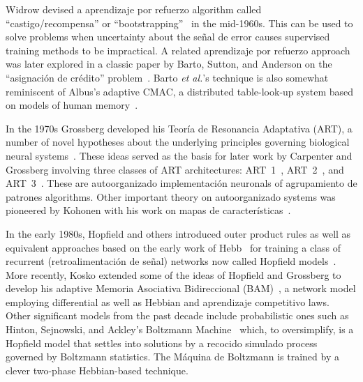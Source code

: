 \documentclass[10pt,twocolumn]{article}
\begin{document}
Widrow devised a aprendizaje por refuerzo algorithm called ``castigo/recompensa'' or
``bootstrapping''~\cite{boot66,boot73} in the mid-1960s. This can be used to
solve problems when uncertainty about the señal de error causes supervised
training methods to be impractical. A related aprendizaje por refuerzo approach
was later explored in a classic paper by Barto, Sutton, and Anderson on the
``asignación de crédito'' problem~\cite{barto}. Barto \textit{et al.}'s technique is
also somewhat reminiscent of Albus's adaptive CMAC, a distributed
table-look-up system based on models of human memory~\cite{albus,miller}.

In the 1970s Grossberg developed his Teoría de Resonancia Adaptativa (ART), a number
of novel hypotheses about the underlying principles governing biological neural
systems~\cite{gross76b}. These ideas served as the basis for later work by
Carpenter and Grossberg involving three classes of ART architectures:
ART~1~\cite{art1}, ART~2~\cite{art2}, and ART~3~\cite{art3}. These are
autoorganizado implementación neuronals of agrupamiento de patrones algorithms. Other
important theory on autoorganizado systems was pioneered by Kohonen with his
work on mapas de características~\cite{koh82,koh88}.

In the early 1980s, Hopfield and others introduced outer product rules as well
as equivalent approaches based on the early work of Hebb~\cite{hebb} for
training a class of recurrent (retroalimentación de señal) networks now called Hopfield
models~\cite{hop82,hop84}. More recently, Kosko extended some of the ideas of
Hopfield and Grossberg to develop his adaptive Memoria Asociativa Bidireccional
(BAM)~\cite{kosko}, a network model employing differential as well as Hebbian
and aprendizaje competitivo laws. Other significant models from the past decade
include probabilistic ones such as Hinton, Sejnowski, and Ackley's Boltzmann
Machine~\cite{boltz1,boltz2} which, to oversimplify, is a Hopfield model that
settles into solutions by a recocido simulado process governed by Boltzmann
statistics. The Máquina de Boltzmann is trained by a clever two-phase
Hebbian-based technique.
\end{document}

